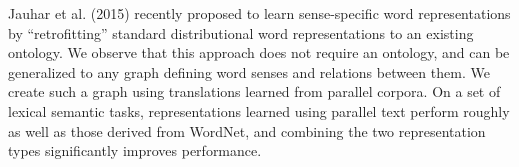 Jauhar et al. (2015) recently proposed to learn sense-specific word representations by ``retrofitting'' standard distributional word representations to an existing ontology. We observe that this approach does not require an ontology, and can be generalized to any graph defining word senses and relations between them. We create such a graph using translations learned from parallel corpora. On a set of lexical semantic tasks, representations learned using parallel text perform roughly as well as those derived from WordNet, and combining the two representation types significantly improves performance.
